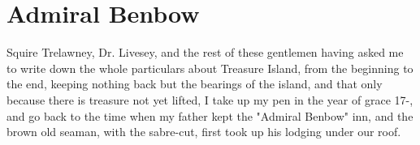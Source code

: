 \documentclass{article}
\begin{document}
\section{Admiral Benbow}
Squire Trelawney, Dr. Livesey, and the rest of these gentlemen having asked me to write down the whole particulars about Treasure Island, from the beginning to the end, keeping nothing back but the bearings of the island, and that only because there is treasure not yet lifted, I take up my pen in the year of grace 17-, and go back to the time when my father kept the "Admiral Benbow" inn, and the brown old seaman, with the sabre-cut, first took up his lodging under our roof.
\end{document}
